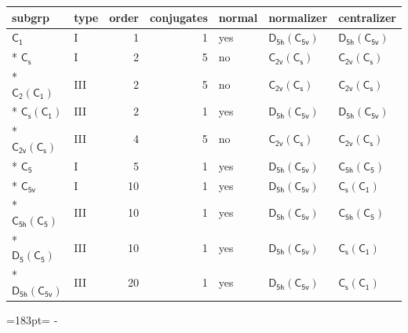 \documentclass[10pt,a4paper]{article}
\newcommand{\needspace}[1]{\par\penalty-100\begingroup\dimen0=#1\relax\dimen2=\pagegoal
  \advance\dimen2-\pagetotal\ifdim\dimen0>\dimen2\relax\ifdim\dimen2>0pt\vfil\break\fi\fi
  \endgroup}
\numberwithin{equation}{section}
\newcommand{\grp}[1]{\mathsf{#1}}
\begin{document}
{\small\begin{longtable}{@{}llrrlll@{}}\toprule
subgrp & type & order & conjugates & normal & normalizer & centralizer\\\midrule\endhead
\bottomrule\endfoot\endlastfoot
\href{../../../rotation/data/pdf/C1.pdf}{$\grp{C_{1}}$} & I & 1 & 1 & yes & \href{D5h-C5v.pdf}{$\grp{D_{5h}}(\grp{C_{5v}})$} & \href{D5h-C5v.pdf}{$\grp{D_{5h}}(\grp{C_{5v}})$}\\*
\href{../../../rotation/data/pdf/C1v.pdf}{$\grp{C_{s}}$} & I & 2 & 5 & no & \href{C2v-C1v.pdf}{$\grp{C_{2v}}(\grp{C_{s}})$} & \href{C2v-C1v.pdf}{$\grp{C_{2v}}(\grp{C_{s}})$}\\*
\href{C2-C1.pdf}{$\grp{C_{2}}(\grp{C_{1}})$} & III & 2 & 5 & no & \href{C2v-C1v.pdf}{$\grp{C_{2v}}(\grp{C_{s}})$} & \href{C2v-C1v.pdf}{$\grp{C_{2v}}(\grp{C_{s}})$}\\*
\href{C1v-C1.pdf}{$\grp{C_{s}}(\grp{C_{1}})$} & III & 2 & 1 & yes & \href{D5h-C5v.pdf}{$\grp{D_{5h}}(\grp{C_{5v}})$} & \href{D5h-C5v.pdf}{$\grp{D_{5h}}(\grp{C_{5v}})$}\\*
\href{C2v-C1v.pdf}{$\grp{C_{2v}}(\grp{C_{s}})$} & III & 4 & 5 & no & \href{C2v-C1v.pdf}{$\grp{C_{2v}}(\grp{C_{s}})$} & \href{C2v-C1v.pdf}{$\grp{C_{2v}}(\grp{C_{s}})$}\\*
\href{../../../rotation/data/pdf/C5.pdf}{$\grp{C_{5}}$} & I & 5 & 1 & yes & \href{D5h-C5v.pdf}{$\grp{D_{5h}}(\grp{C_{5v}})$} & \href{C5h-C5.pdf}{$\grp{C_{5h}}(\grp{C_{5}})$}\\*
\href{../../../rotation/data/pdf/C5v.pdf}{$\grp{C_{5v}}$} & I & 10 & 1 & yes & \href{D5h-C5v.pdf}{$\grp{D_{5h}}(\grp{C_{5v}})$} & \href{C1v-C1.pdf}{$\grp{C_{s}}(\grp{C_{1}})$}\\*
\href{C5h-C5.pdf}{$\grp{C_{5h}}(\grp{C_{5}})$} & III & 10 & 1 & yes & \href{D5h-C5v.pdf}{$\grp{D_{5h}}(\grp{C_{5v}})$} & \href{C5h-C5.pdf}{$\grp{C_{5h}}(\grp{C_{5}})$}\\*
\href{D5-C5.pdf}{$\grp{D_{5}}(\grp{C_{5}})$} & III & 10 & 1 & yes & \href{D5h-C5v.pdf}{$\grp{D_{5h}}(\grp{C_{5v}})$} & \href{C1v-C1.pdf}{$\grp{C_{s}}(\grp{C_{1}})$}\\*
\href{D5h-C5v.pdf}{$\grp{D_{5h}}(\grp{C_{5v}})$} & III & 20 & 1 & yes & \href{D5h-C5v.pdf}{$\grp{D_{5h}}(\grp{C_{5v}})$} & \href{C1v-C1.pdf}{$\grp{C_{s}}(\grp{C_{1}})$}\\
\bottomrule\end{longtable}}
\needspace{183pt}
\end{document}
